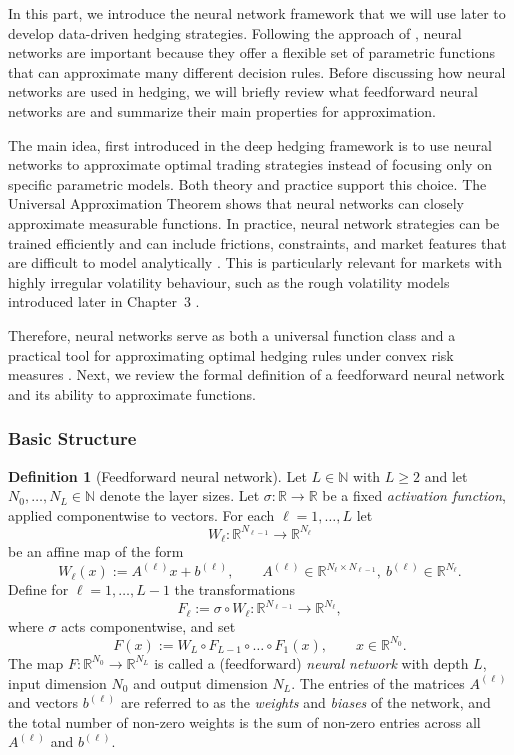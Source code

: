 \documentclass[12pt,a4paper]{article}
\theoremstyle{definition}
\newtheorem{definition}{Definition}[section]
\theoremstyle{plain}
\theoremstyle{remark}
\theoremstyle{plain}
\begin{document}
In this part, we introduce the neural network framework that we will use later to develop data-driven hedging strategies. 
Following the approach of \cite{Buehler2019DeepHedging}, neural networks are important because they offer a flexible set of parametric functions that can approximate many different decision rules. 
Before discussing how neural networks are used in hedging, we will briefly review what feedforward neural networks are and summarize their main properties for approximation.

The main idea, first introduced in the deep hedging framework \cite{Buehler2019DeepHedging} is to use neural networks to approximate optimal trading strategies instead of focusing only on specific parametric models. 
Both theory and practice support this choice. The Universal Approximation Theorem \cite{Hornik1991} shows that neural networks can closely approximate measurable functions. 
In practice, neural network strategies can be trained efficiently and can include frictions, constraints, and market features that are difficult to model analytically \cite{Horvath2021DeepRough}. This is particularly relevant for markets with highly irregular volatility behaviour, such as the rough volatility models introduced later in Chapter~3 \cite{GatheralRough,BayerFriz2016}.

Therefore, neural networks serve as both a universal function class and a practical tool for approximating optimal hedging rules under convex risk measures \cite{FoellmerSchied2016}. 
Next, we review the formal definition of a feedforward neural network and its ability to approximate functions.


\subsubsection{Basic Structure}
\begin{definition}[Feedforward neural network]
\label{def:ffnn}
Let $L\in\mathbb N$ with $L\ge 2$ and let $N_0,\dots,N_L\in\mathbb N$ denote the layer sizes. 
Let $\sigma:\mathbb R\to\mathbb R$ be a fixed \emph{activation function}, applied componentwise to vectors. 
For each $\ell=1,\dots,L$ let
\[
    W_\ell : \mathbb R^{N_{\ell-1}} \to \mathbb R^{N_\ell}
\]
be an affine map of the form
\[
    W_\ell(x) := A^{(\ell)} x + b^{(\ell)},
    \qquad
    A^{(\ell)} \in \mathbb R^{N_\ell\times N_{\ell-1}},\ 
    b^{(\ell)} \in \mathbb R^{N_\ell}.
\]
Define for $\ell=1,\dots,L-1$ the transformations
\[
    F_\ell := \sigma \circ W_\ell : \mathbb R^{N_{\ell-1}} \to \mathbb R^{N_\ell},
\]
where $\sigma$ acts componentwise, and set
\[
    F(x) := W_L \circ F_{L-1} \circ \dots \circ F_1(x),
    \qquad x\in\mathbb R^{N_0}.
\]
The map $F:\mathbb R^{N_0}\to\mathbb R^{N_L}$ is called a (feedforward) \emph{neural network} with depth $L$, input dimension $N_0$ and output dimension $N_L$. 
The entries of the matrices $A^{(\ell)}$ and vectors $b^{(\ell)}$ are referred to as the \emph{weights} and \emph{biases} of the network, and the total number of non-zero weights is the sum of non-zero entries across all $A^{(\ell)}$ and $b^{(\ell)}$.
\end{definition}
\end{document}
